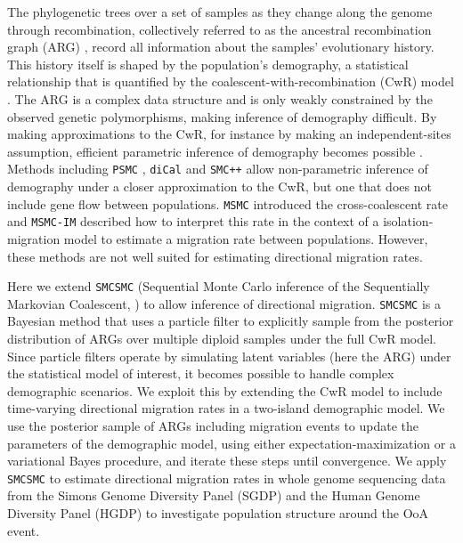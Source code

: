 \documentclass{article}
\begin{document}
The phylogenetic trees over a set of samples as they change along the genome through recombination, collectively referred to as the ancestral recombination graph (ARG) \cite{Griffiths1997a,Rasmussen2014}, record all information about the samples' evolutionary history.  This history itself is shaped by the population's demography, a statistical relationship that is quantified by the coalescent-with-recombination (CwR) model \cite{Griffiths1997a}.  The ARG is a complex data structure and is only weakly constrained by the observed genetic polymorphisms, making inference of demography difficult. By making approximations to the CwR, for instance by making an independent-sites assumption, efficient parametric inference of demography becomes possible \cite{Excoffier2013,McVean2005}.  Methods including {\tt PSMC} \cite{Li2011}, {\tt diCal} \cite{Steinrucken2015} and {\tt SMC++} \cite{Terhorst2015} allow non-parametric inference of demography under a closer approximation to the CwR, but one that does not include gene flow between populations. {\tt MSMC} \cite{Schiffels2014} introduced the cross-coalescent rate and {\tt MSMC-IM} described how to interpret this rate in the context of a isolation-migration model to estimate a migration rate between populations\cite{Wang2019a}. However, these methods are not well suited for estimating directional migration rates.

Here we extend {\tt SMCSMC} (Sequential Monte Carlo inference of the Sequentially Markovian Coalescent, \cite{Henderson2018}) to allow inference of directional migration.  {\tt SMCSMC} is a Bayesian method that uses a particle filter to explicitly sample from the posterior distribution of ARGs over multiple diploid samples under the full CwR model.
Since particle filters operate by simulating latent variables (here the ARG) under the statistical model of interest, it becomes possible to handle complex demographic scenarios.  We exploit this by extending the CwR model to include time-varying directional migration rates in a two-island demographic model.  We use the posterior sample of ARGs including migration events to update the parameters of the demographic model, using either expectation-maximization or a variational Bayes procedure, and iterate these steps until convergence.   We apply {\tt SMCSMC} to estimate directional migration rates in whole genome sequencing data from the Simons Genome Diversity Panel (SGDP) \cite{Mallick2016} and the Human Genome Diversity Panel (HGDP) \cite{Bergstrom2019} to investigate population structure around the OoA event.
\end{document}
